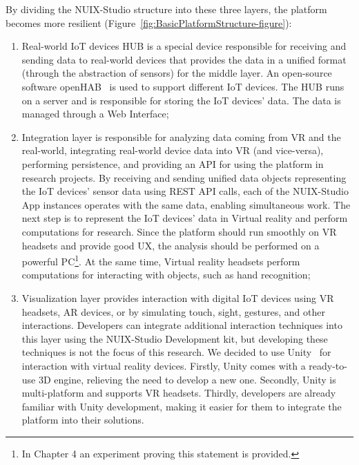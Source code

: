 By dividing the NUIX-Studio structure into these three layers, the platform becomes more resilient (Figure~\ref{fig:BasicPlatformStructure-figure}): 
\begin{enumerate}
    \item Real-world IoT devices HUB is a special device responsible for receiving and sending data to real-world devices that provides the data in a unified format (through the abstraction of sensors) for the middle layer. An open-source software openHAB~\cite{OpenHab} is used to support different IoT devices. The HUB runs on a server and is responsible for storing the IoT devices' data. The data is managed through a Web Interface;
    \item Integration layer is responsible for analyzing data coming from VR and the real-world, integrating real-world device data into VR (and vice-versa), performing persistence, and providing an API for using the platform in research projects. By receiving and sending unified data objects representing the IoT devices' sensor data using REST API calls, each of the NUIX-Studio App instances operates with the same data, enabling simultaneous work. The next step is to represent the IoT devices' data in Virtual reality and perform computations for research. Since the platform should run smoothly on VR headsets and provide good UX, the analysis should be performed on a powerful PC\footnote{In Chapter 4 an experiment proving this statement is provided.}. At the same time, Virtual reality headsets perform computations for interacting with objects, such as hand recognition;
    \item Visualization layer provides interaction with digital IoT devices using VR headsets, AR devices, or by simulating touch, sight, gestures, and other interactions. Developers can integrate additional interaction techniques into this layer using the NUIX-Studio Development kit, but developing these techniques is not the focus of this research. We decided to use Unity~\cite{Unity} for interaction with virtual reality devices. Firstly, Unity comes with a ready-to-use 3D engine, relieving the need to develop a new one. Secondly, Unity is multi-platform and supports VR headsets. Thirdly, developers are already familiar with Unity development, making it easier for them to integrate the platform into their solutions.
\end{enumerate}

